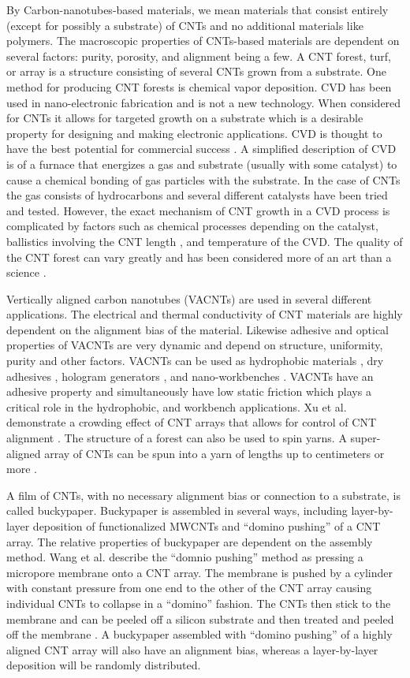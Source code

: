 By Carbon-nanotubes-based materials, we mean materials that consist entirely (except for possibly a substrate) of CNTs and no additional materials like polymers.	
The macroscopic properties of CNTs-based materials are dependent on several factors: purity, porosity, and alignment being a few.
A CNT forest, turf, or array is a structure consisting of several CNTs grown from a substrate.
One method for producing CNT forests is chemical vapor deposition.
CVD has been used in nano-electronic fabrication and is not a new technology.
When considered for CNTs it allows for targeted growth on a substrate which is a desirable property for designing and making electronic applications.
CVD is thought to have the best potential for commercial success \cite{Nessim2010}.
A simplified description of CVD is of a furnace that energizes a gas and substrate (usually with some catalyst) to cause a chemical bonding of gas particles with the substrate.
In the case of CNTs the gas consists of hydrocarbons and several different catalysts have been tried and tested.
However, the exact mechanism of CNT growth in a CVD process is complicated by factors such as chemical processes depending on the catalyst, ballistics involving the CNT length \cite{Louchev2003}, and temperature of the CVD.
The quality of the CNT forest can vary greatly and has been considered more of an art than a science \cite{Nessim2010}.  
	
Vertically aligned carbon nanotubes (VACNTs) are used in several different applications.
The electrical and thermal conductivity of CNT materials are highly dependent on the alignment bias of the material.
Likewise adhesive and optical properties of VACNTs are very dynamic and depend on structure, uniformity, purity and other factors.
VACNTs can be used as hydrophobic materials \cite{Lau2003}, dry adhesives \cite{Chen2012}, hologram generators \cite{Montelongo2013}, and nano-workbenches \cite{Gjerde2006}.
VACNTs have an adhesive property and simultaneously have low static friction which plays a critical role in the hydrophobic, and workbench applications.
Xu et al. demonstrate a crowding effect of CNT arrays that allows for control of CNT alignment \cite{Xu2012}.
The structure of a forest can also be used to spin yarns.
A super-aligned array of CNTs can be spun into a yarn of lengths up to centimeters or more \cite{Jiang2002}.
	
A film of CNTs, with no necessary alignment bias or connection to a substrate, is called buckypaper.
Buckypaper is assembled in several ways, including layer-by-layer deposition of functionalized MWCNTs \cite{Lee2008} and ``domino pushing'' of a CNT array.
The relative properties of buckypaper are dependent on the assembly method.
Wang et al. describe the ``domnio pushing'' method as pressing a micropore membrane onto a CNT array.
The membrane is pushed by a cylinder with constant pressure from one end to the other of the CNT array causing individual CNTs to collapse in a ``domino'' fashion.
The CNTs then stick to the membrane and can be peeled off a silicon substrate and then treated and peeled off the membrane \cite{Wang2008}.
A buckypaper assembled with ``domino pushing'' of a highly aligned CNT array will also have an alignment bias, whereas a layer-by-layer deposition will be randomly distributed.

